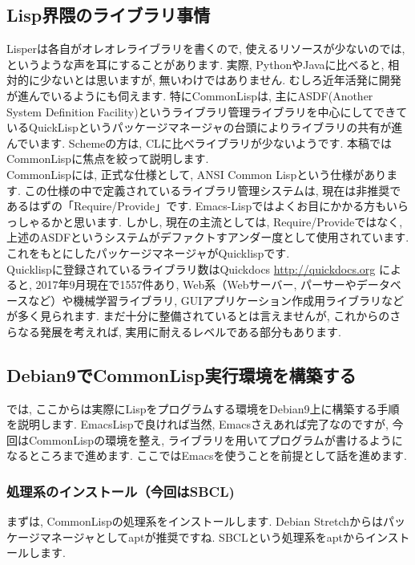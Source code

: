 \documentclass[mingoth,a4paper]{jsarticle}
\begin{document}
\subsection{Lisp界隈のライブラリ事情}
 Lisperは各自がオレオレライブラリを書くので, 使えるリソースが少ないのでは, というような声を耳にすることがあります. 実際, PythonやJavaに比べると, 相対的に少ないとは思いますが, 無いわけではありません. むしろ近年活発に開発が進んでいるようにも伺えます. 特にCommonLispは, 主にASDF(Another System Definition Facility)というライブラリ管理ライブラリを中心にしてできているQuickLispというパッケージマネージャの台頭によりライブラリの共有が進んでいます. Schemeの方は, CLに比べライブラリが少ないようです. 本稿ではCommonLispに焦点を絞って説明します. \vspace{1em}\\
CommonLispには, 正式な仕様として, ANSI Common Lispという仕様があります. この仕様の中で定義されているライブラリ管理システムは, 現在は非推奨であるはずの「Require/Provide」です. Emacs-Lispではよくお目にかかる方もいらっしゃるかと思います. 
しかし, 現在の主流としては, Require/Provideではなく, 上述のASDFというシステムがデファクトすアンダー度として使用されています. これをもとにしたパッケージマネージャがQuicklispです. \vspace{1em}\\
Quicklispに登録されているライブラリ数はQuickdocs \url{http://quickdocs.org} によると, 2017年9月現在で1557件あり, Web系（Webサーバー, パーサーやデータベースなど）や機械学習ライブラリ, GUIアプリケーション作成用ライブラリなどが多く見られます. 
まだ十分に整備されているとは言えませんが, これからのさらなる発展を考えれば, 実用に耐えるレベルである部分もあります. 

\subsection{Debian9でCommonLisp実行環境を構築する}

では, ここからは実際にLispをプログラムする環境をDebian9上に構築する手順を説明します. EmacsLispで良ければ当然, Emacsさえあれば完了なのですが, 今回はCommonLispの環境を整え, ライブラリを用いてプログラムが書けるようになるところまで進めます. ここではEmacsを使うことを前提として話を進めます. 

\subsubsection{処理系のインストール（今回はSBCL)}

まずは, CommonLispの処理系をインストールします. Debian Stretchからはパッケージマネージャとしてaptが推奨ですね. SBCLという処理系をaptからインストールします. 
\end{document}
